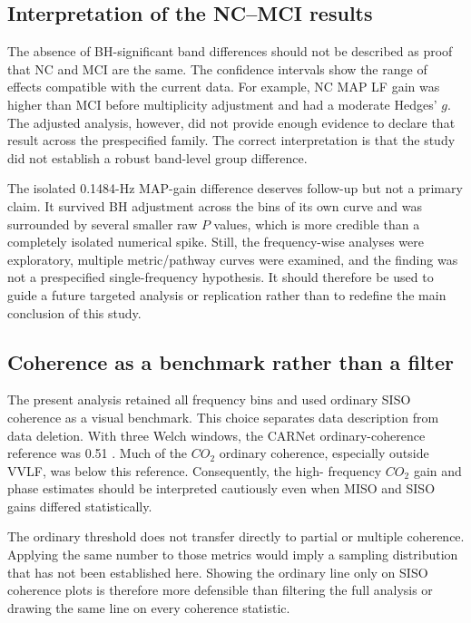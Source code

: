 \documentclass[12pt]{article}
\newcommand{\COtwo}{CO_2}
\begin{document}
\subsection{Interpretation of the NC--MCI results}

The absence of BH-significant band differences should not be described as
proof that NC and MCI are the same. The confidence intervals show the range of
effects compatible with the current data. For example, NC MAP LF gain was
higher than MCI before multiplicity adjustment and had a moderate Hedges'
$g$. The adjusted analysis, however, did not provide enough evidence to
declare that result across the prespecified family. The correct interpretation
is that the study did not establish a robust band-level group difference.

The isolated 0.1484-Hz MAP-gain difference deserves follow-up but not a primary
claim. It survived BH adjustment across the bins of its own curve and was
surrounded by several smaller raw $P$ values, which is more credible than a
completely isolated numerical spike. Still, the frequency-wise analyses were
exploratory, multiple metric/pathway curves were examined, and the finding was
not a prespecified single-frequency hypothesis. It should therefore be used
to guide a future targeted analysis or replication rather than to redefine
the main conclusion of this study.

\subsection{Coherence as a benchmark rather than a filter}

The present analysis retained all frequency bins and used ordinary SISO
coherence as a visual benchmark. This choice separates data description from
data deletion. With three Welch windows, the CARNet ordinary-coherence
reference was 0.51 \cite{Panerai2023}. Much of the $\COtwo$ ordinary coherence,
especially outside VVLF, was below this reference. Consequently, the high-
frequency $\COtwo$ gain and phase estimates should be interpreted cautiously
even when MISO and SISO gains differed statistically.

The ordinary threshold does not transfer directly to partial or multiple
coherence. Applying the same number to those metrics would imply a sampling
distribution that has not been established here. Showing the ordinary line
only on SISO coherence plots is therefore more defensible than filtering the
full analysis or drawing the same line on every coherence statistic.
\end{document}
